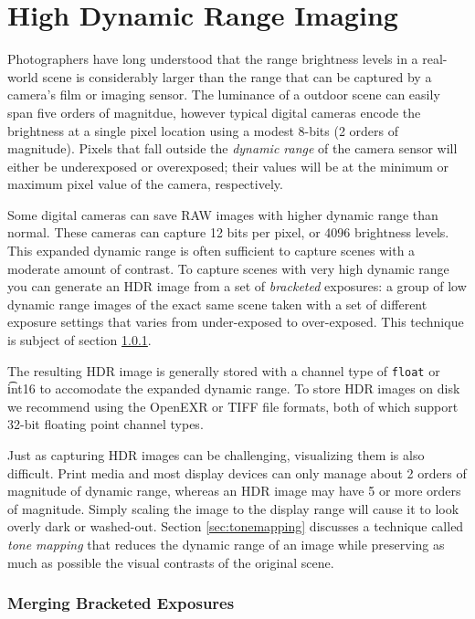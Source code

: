 \chapter{High Dynamic Range Imaging}\label{ch:hdr-imaging}

Photographers have long understood that the range brightness levels in
a real-world scene is considerably larger than the range that can be
captured by a camera's film or imaging sensor.  The luminance of a
outdoor scene can easily span five orders of magnitdue, however
typical digital cameras encode the brightness at a single pixel
location using a modest 8-bits (2 orders of magnitude).  Pixels that
fall outside the {\em dynamic range} of the camera sensor will either
be underexposed or overexposed; their values will be at the minimum or
maximum pixel value of the camera, respectively.

Some digital cameras can save RAW images with higher dynamic range
than normal.  These cameras can capture 12 bits per pixel, or 4096
brightness levels.  This expanded dynamic range is often sufficient to
capture scenes with a moderate amount of contrast. To capture scenes
with very high dynamic range you can generate an HDR image from a set
of {\em bracketed} exposures: a group of low dynamic range images of
the exact same scene taken with a set of different exposure settings
that varies from under-exposed to over-exposed.  This technique is
subject of section \ref{sec:hdr_merge}.  

The resulting HDR image is generally stored with a channel type of
{\tt float} or {\t int16} to accomodate the expanded dynamic range.
To store HDR images on disk we recommend using the OpenEXR or TIFF
file formats, both of which support 32-bit floating point channel
types.

Just as capturing HDR images can be challenging, visualizing them is
also difficult.  Print media and most display devices can only manage
about 2 orders of magnitude of dynamic range, whereas an HDR image may
have 5 or more orders of magnitude. Simply scaling the image to the
display range will cause it to look overly dark or washed-out. Section
\ref{sec:tonemapping} discusses a technique called {\em tone mapping}
that reduces the dynamic range of an image while preserving as much as
possible the visual contrasts of the original scene.

\subsection{Merging Bracketed Exposures}
\label{sec:hdr_merge}

